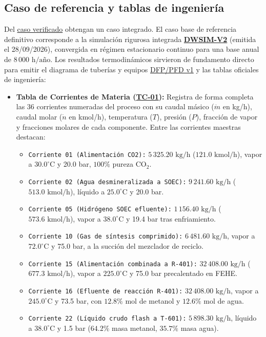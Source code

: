 \documentclass[11pt,letterpaper]{article}
\newcommand{\Ficha}[1]{\hyperlink{ev:#1}{\textsf{\textbf{#1}}}}
\begin{document}
\subsection{Caso de referencia y tablas de ingeniería}\label{sec:tablas-proceso}
Del \hyperref[sec:sim-verif]{caso verificado} obtengan un caso integrado.
El caso base de referencia definitivo corresponde a la simulación rigurosa integrada \Ficha{DWSIM-V2} (emitida el 28/09/2026), convergida en régimen estacionario continuo para una base anual de $8\,000\mbox{ h/año}$. Los resultados termodinámicos sirvieron de fundamento directo para emitir el diagrama de tuberías y equipos \hyperref[fig:dfpv1]{DFP/PFD v1} y las tablas oficiales de ingeniería:
\begin{itemize}
  \item \textbf{Tabla de Corrientes de Materia (\Ficha{TC-01}):} Registra de forma completa las 36 corrientes numeradas del proceso con su caudal másico ($\dot{m}$ en kg/h), caudal molar ($\dot{n}$ en kmol/h), temperatura ($T$), presión ($P$), fracción de vapor y fracciones molares de cada componente. Entre las corrientes maestras destacan:
  \begin{itemize}
    \item \texttt{Corriente 01 (Alimentación CO2):} $5\,325.20\mbox{ kg/h}$ ($121.0\mbox{ kmol/h}$), vapor a $30.0^\circ\mbox{C}$ y 20.0 bar, $100\%$ pureza $\mbox{CO}_2$.
    \item \texttt{Corriente 02 (Agua desmineralizada a SOEC):} $9\,241.60\mbox{ kg/h}$ ($513.0\mbox{ kmol/h}$), líquido a $25.0^\circ\mbox{C}$ y 20.0 bar.
    \item \texttt{Corriente 05 (Hidrógeno SOEC efluente):} $1\,156.40\mbox{ kg/h}$ ($573.6\mbox{ kmol/h}$), vapor a $38.0^\circ\mbox{C}$ y 19.4 bar tras enfriamiento.
    \item \texttt{Corriente 10 (Gas de síntesis comprimido):} $6\,481.60\mbox{ kg/h}$, vapor a $72.0^\circ\mbox{C}$ y 75.0 bar, a la succión del mezclador de reciclo.
    \item \texttt{Corriente 15 (Alimentación combinada a R-401):} $32\,408.00\mbox{ kg/h}$ ($677.3\mbox{ kmol/h}$), vapor a $225.0^\circ\mbox{C}$ y 75.0 bar precalentado en FEHE.
    \item \texttt{Corriente 16 (Efluente de reacción R-401):} $32\,408.00\mbox{ kg/h}$, vapor a $245.0^\circ\mbox{C}$ y 73.5 bar, con $12.8\%$ mol de metanol y $12.6\%$ mol de agua.
    \item \texttt{Corriente 22 (Líquido crudo flash a T-601):} $5\,898.30\mbox{ kg/h}$, líquido a $38.0^\circ\mbox{C}$ y 1.5 bar ($64.2\%$ masa metanol, $35.7\%$ masa agua).

\end{itemize}
\end{itemize}
\end{document}
